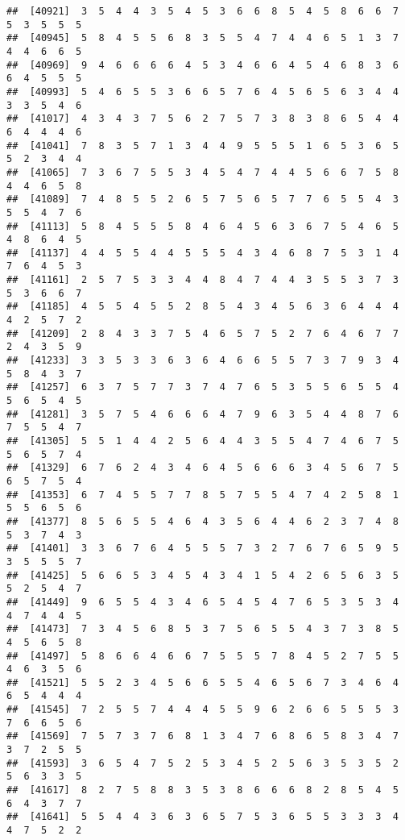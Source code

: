 \documentclass[
]{book}
\begin{document}
\begin{verbatim}
##  [40921]  3  5  4  4  3  5  4  5  3  6  6  8  5  4  5  8  6  6  7  5  3  5  5  5
##  [40945]  5  8  4  5  5  6  8  3  5  5  4  7  4  4  6  5  1  3  7  4  4  6  6  5
##  [40969]  9  4  6  6  6  6  4  5  3  4  6  6  4  5  4  6  8  3  6  6  4  5  5  5
##  [40993]  5  4  6  5  5  3  6  6  5  7  6  4  5  6  5  6  3  4  4  3  3  5  4  6
##  [41017]  4  3  4  3  7  5  6  2  7  5  7  3  8  3  8  6  5  4  4  6  4  4  4  6
##  [41041]  7  8  3  5  7  1  3  4  4  9  5  5  5  1  6  5  3  6  5  5  2  3  4  4
##  [41065]  7  3  6  7  5  5  3  4  5  4  7  4  4  5  6  6  7  5  8  4  4  6  5  8
##  [41089]  7  4  8  5  5  2  6  5  7  5  6  5  7  7  6  5  5  4  3  5  5  4  7  6
##  [41113]  5  8  4  5  5  5  8  4  6  4  5  6  3  6  7  5  4  6  5  4  8  6  4  5
##  [41137]  4  4  5  5  4  4  5  5  5  4  3  4  6  8  7  5  3  1  4  7  6  4  5  3
##  [41161]  2  5  7  5  3  3  4  4  8  4  7  4  4  3  5  5  3  7  3  5  3  6  6  7
##  [41185]  4  5  5  4  5  5  2  8  5  4  3  4  5  6  3  6  4  4  4  4  2  5  7  2
##  [41209]  2  8  4  3  3  7  5  4  6  5  7  5  2  7  6  4  6  7  7  2  4  3  5  9
##  [41233]  3  3  5  3  3  6  3  6  4  6  6  5  5  7  3  7  9  3  4  5  8  4  3  7
##  [41257]  6  3  7  5  7  7  3  7  4  7  6  5  3  5  5  6  5  5  4  5  6  5  4  5
##  [41281]  3  5  7  5  4  6  6  6  4  7  9  6  3  5  4  4  8  7  6  7  5  5  4  7
##  [41305]  5  5  1  4  4  2  5  6  4  4  3  5  5  4  7  4  6  7  5  5  6  5  7  4
##  [41329]  6  7  6  2  4  3  4  6  4  5  6  6  6  3  4  5  6  7  5  6  5  7  5  4
##  [41353]  6  7  4  5  5  7  7  8  5  7  5  5  4  7  4  2  5  8  1  5  5  6  5  6
##  [41377]  8  5  6  5  5  4  6  4  3  5  6  4  4  6  2  3  7  4  8  5  3  7  4  3
##  [41401]  3  3  6  7  6  4  5  5  5  7  3  2  7  6  7  6  5  9  5  3  5  5  5  7
##  [41425]  5  6  6  5  3  4  5  4  3  4  1  5  4  2  6  5  6  3  5  5  2  5  4  7
##  [41449]  9  6  5  5  4  3  4  6  5  4  5  4  7  6  5  3  5  3  4  4  7  4  4  5
##  [41473]  7  3  4  5  6  8  5  3  7  5  6  5  5  4  3  7  3  8  5  4  5  6  5  8
##  [41497]  5  8  6  6  4  6  6  7  5  5  5  7  8  4  5  2  7  5  5  4  6  3  5  6
##  [41521]  5  5  2  3  4  5  6  6  5  5  4  6  5  6  7  3  4  6  4  6  5  4  4  4
##  [41545]  7  2  5  5  7  4  4  4  5  5  9  6  2  6  6  5  5  5  3  7  6  6  5  6
##  [41569]  7  5  7  3  7  6  8  1  3  4  7  6  8  6  5  8  3  4  7  3  7  2  5  5
##  [41593]  3  6  5  4  7  5  2  5  3  4  5  2  5  6  3  5  3  5  2  5  6  3  3  5
##  [41617]  8  2  7  5  8  8  3  5  3  8  6  6  6  8  2  8  5  4  5  6  4  3  7  7
##  [41641]  5  5  4  4  3  6  3  6  5  7  5  3  6  5  5  3  3  3  4  4  7  5  2  2

\end{verbatim}
\end{document}
